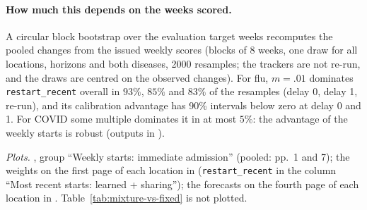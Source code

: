 \documentclass[11pt,a4paper]{article}
\theoremstyle{definition}
\theoremstyle{remark}
\begin{document}
\paragraph{How much this depends on the weeks scored.}
\label{sec:mixture-bootstrap}
A circular block bootstrap over the evaluation target weeks recomputes the
pooled changes from the issued weekly scores (blocks of 8 weeks, one draw
for all locations, horizons and both diseases, 2000 resamples; the trackers
are not re-run, and the draws are centred on the observed changes). For
flu, $m=.01$ dominates \texttt{restart\_recent} overall in $93\%$, $85\%$
and $83\%$ of the resamples (delay 0, delay 1, re-run), and its calibration
advantage has 90\% intervals below zero at delay 0 and 1. For COVID some
multiple dominates it in at most $5\%$: the advantage of the weekly starts
is robust (outputs in
).

\emph{Plots.} , group ``Weekly starts:
immediate admission'' (pooled: pp.~1 and 7); the weights on the first page
of each location in  (\texttt{restart\_recent}
in the column ``Most recent starts: learned + sharing''); the forecasts on
the fourth page of each location in .
Table~\ref{tab:mixture-vs-fixed} is not plotted.
\end{document}
